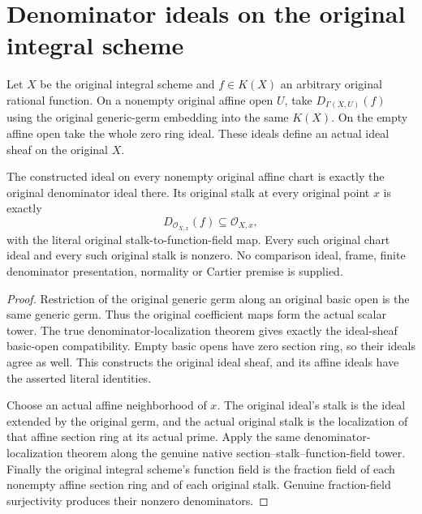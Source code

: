 \section{Denominator ideals on the original integral scheme}

\begin{definition}
\label{def:fc-scheme-rational-denominators}
\leanok
{}
Let $X$ be the original integral scheme and $f\in K(X)$ an arbitrary
original rational function. On a nonempty original affine open $U$, take
$D_{\Gamma(X,U)}(f)$ using the original generic-germ embedding into the
same $K(X)$. On the empty affine open take the whole zero ring ideal.
These ideals define an actual ideal sheaf on the original $X$.
\end{definition}

\begin{theorem}
\label{thm:fc-scheme-rational-denominator-stalks}
\leanok
{}
The constructed ideal on every nonempty original affine chart is exactly
the original denominator ideal there. Its original stalk at every original
point $x$ is exactly
\[
 D_{\mathcal O_{X,x}}(f)\subseteq\mathcal O_{X,x},
\]
with the literal original stalk-to-function-field map. Every such original
chart ideal and every such original stalk is nonzero. No comparison ideal,
frame, finite denominator presentation, normality or Cartier premise is
supplied.
\end{theorem}
\begin{proof}
Restriction of the original generic germ along an original basic open
is the same generic germ. Thus the original coefficient maps form the
actual scalar tower. The true denominator-localization theorem gives
exactly the ideal-sheaf basic-open compatibility. Empty basic opens have
zero section ring, so their ideals agree as well. This constructs the
original ideal sheaf, and its affine ideals have the asserted literal
identities.

Choose an actual affine neighborhood of $x$. The original ideal's stalk
is the ideal extended by the original germ, and the actual original stalk
is the localization of that affine section ring at its actual prime.
Apply the same denominator-localization theorem along the genuine native
section--stalk--function-field tower. Finally the original integral
scheme's function field is the fraction field of each nonempty affine
section ring and of each original stalk. Genuine fraction-field
surjectivity produces their nonzero denominators.
\end{proof}
